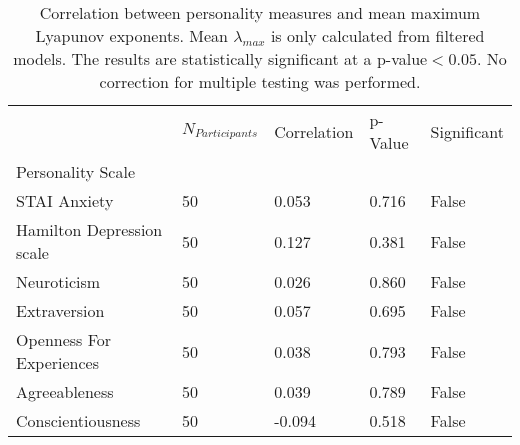\begin{table}
\centering
\caption{Correlation between personality measures and mean maximum Lyapunov exponents. Mean $\lambda_{max}$                                                                                   is only calculated from filtered models. The results are statistically significant at a p-value$<0.05$.                                                                                   No correction for multiple testing was performed.}
\label{tab:mean_le_filtered_personality_cor_table}
\begin{tabular}{lllll}
\toprule
 & $N_{Participants}$ & Correlation & p-Value & Significant \\
Personality Scale &  &  &  &  \\
\midrule
STAI Anxiety & 50 & 0.053 & 0.716 & False \\
Hamilton Depression scale & 50 & 0.127 & 0.381 & False \\
Neuroticism & 50 & 0.026 & 0.860 & False \\
Extraversion & 50 & 0.057 & 0.695 & False \\
Openness For Experiences & 50 & 0.038 & 0.793 & False \\
Agreeableness & 50 & 0.039 & 0.789 & False \\
Conscientiousness & 50 & -0.094 & 0.518 & False \\
\bottomrule
\end{tabular}
\end{table}
